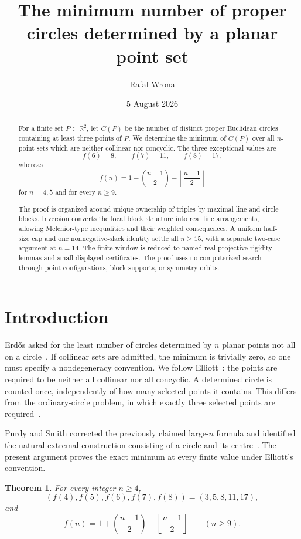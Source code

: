 \documentclass[11pt]{article}
\title{The minimum number of proper circles determined by a planar point set}
\author{Rafal Wrona}
\date{5 August 2026}
\newtheorem{theorem}{Theorem}[section]
\theoremstyle{definition}
\theoremstyle{remark}
\newcommand{\R}{\mathbb{R}}
\newcommand{\floor}[1]{\left\lfloor #1\right\rfloor}
\begin{document}
\maketitle

\begin{abstract}
For a finite set \(P\subset\R^2\), let \(C(P)\) be the number of distinct
proper Euclidean circles containing at least three points of \(P\).  We
determine the minimum of \(C(P)\) over all \(n\)-point sets which are neither
collinear nor concyclic.  The three exceptional values are
\[
 f(6)=8,\qquad f(7)=11,\qquad f(8)=17,
\]
whereas
\[
 f(n)=1+\binom{n-1}{2}-\floor{\frac{n-1}{2}}
\]
for \(n=4,5\) and for every \(n\ge9\).

The proof is organized around unique ownership of triples by maximal line
and circle blocks.  Inversion converts the local block structure into real
line arrangements, allowing Melchior-type inequalities and their weighted
consequences.  A uniform half-size cap and one nonnegative-slack identity
settle all \(n\ge15\), with a separate two-case argument at \(n=14\).
The finite window is reduced to named real-projective rigidity lemmas and
small displayed certificates.  The proof uses no computerized search
through point configurations, block supports, or symmetry orbits.
\end{abstract}

\section{Introduction}

Erd\H{o}s asked for the least number of circles determined by \(n\) planar
points not all on a circle~\cite{Erdos1961}.  If collinear sets are admitted,
the minimum is trivially zero, so one must specify a nondegeneracy
convention.  We follow Elliott~\cite{Elliott1967}: the points are required
to be neither all collinear nor all concyclic.  A determined circle is
counted once, independently of how many selected points it contains.
This differs from the ordinary-circle problem, in which exactly three
selected points are required~\cite{LinEtAl2018}.

Purdy and Smith corrected the previously claimed large-\(n\) formula and
identified the natural extremal construction consisting of a circle and
its centre~\cite{PurdySmith2010}.  The present argument proves the exact
minimum at every finite value under Elliott's convention.

\begin{theorem}\label{thm:main}
For every integer \(n\ge4\),
\[
 (f(4),f(5),f(6),f(7),f(8))=(3,5,8,11,17),
\]
and
\[
 \boxed{\displaystyle
 f(n)=1+\binom{n-1}{2}-\floor{\frac{n-1}{2}}}
 \qquad(n\ge9).
\]
\end{theorem}
\end{document}
